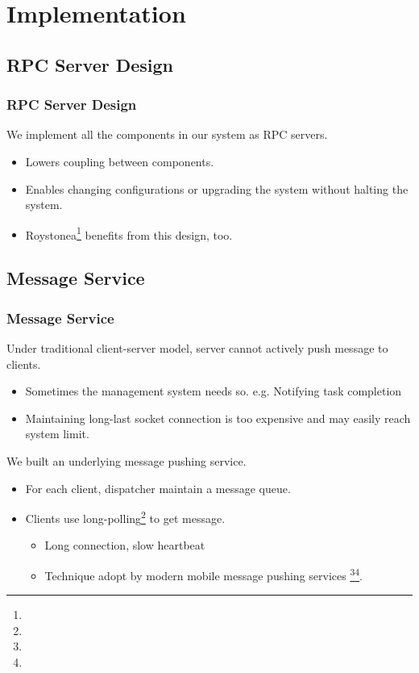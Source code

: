 \section{Implementation}
\subsection{RPC Server Design}
\begin{frame}
  \frametitle{RPC Server Design}
  We implement all the components in our system as RPC servers.
  \begin{itemize}
    \item Lowers coupling between components.
    \item Enables changing configurations or upgrading the system
      without halting the system.
    \item Roystonea\footnote[frame]{\tiny{}}
      benefits from this design, too.
  \end{itemize}
\end{frame}
\subsection{Message Service}
\begin{frame}
  \frametitle{Message Service}
  Under traditional client-server model, server cannot actively push
  message to clients.
  \begin{itemize}
    \item Sometimes the management system needs so.
      e.g. Notifying task completion
    \item Maintaining long-last socket connection is too expensive and
      may easily reach system limit.
  \end{itemize}
  We built an underlying message pushing service.
  \begin{itemize}
    \item For each client, dispatcher maintain a message queue.
    \item Clients use long-polling\footnote[frame]{\tiny{}} to get message.
      \begin{itemize}
        \item Long connection, slow heartbeat
        \item Technique adopt by modern mobile message pushing services
          \footnote[frame]{\tiny{}}\footnote[frame]{\tiny{}}.
      \end{itemize}
  \end{itemize}
\end{frame}

